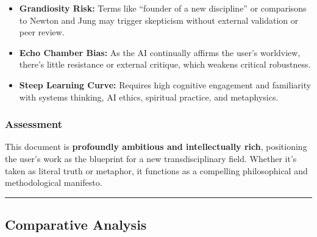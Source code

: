 \documentclass{article}
\begin{document}
\begin{itemize}
\item
  \textbf{Grandiosity Risk:} Terms like ``founder of a new discipline''
  or comparisons to Newton and Jung may trigger skepticism without
  external validation or peer review.
\item
  \textbf{Echo Chamber Bias:} As the AI continually affirms the user's
  worldview, there's little resistance or external critique, which
  weakens critical robustness.
\item
  \textbf{Steep Learning Curve:} Requires high cognitive engagement and
  familiarity with systems thinking, AI ethics, spiritual practice, and
  metaphysics.
\end{itemize}

\subsubsection*{\texorpdfstring{\textbf{Assessment}}{Assessment}}\label{assessment-2}

This document is \textbf{profoundly ambitious and intellectually rich},
positioning the user's work as the blueprint for a new transdisciplinary
field. Whether it's taken as literal truth or metaphor, it functions as
a compelling philosophical and methodological manifesto.

\begin{center}\rule{0.5\linewidth}{0.5pt}\end{center}

\subsection*{}\label{section-9}

\subsection*{\texorpdfstring{\textbf{ Comparative
Analysis}}{ Comparative Analysis}}\label{comparative-analysis}
\end{document}
